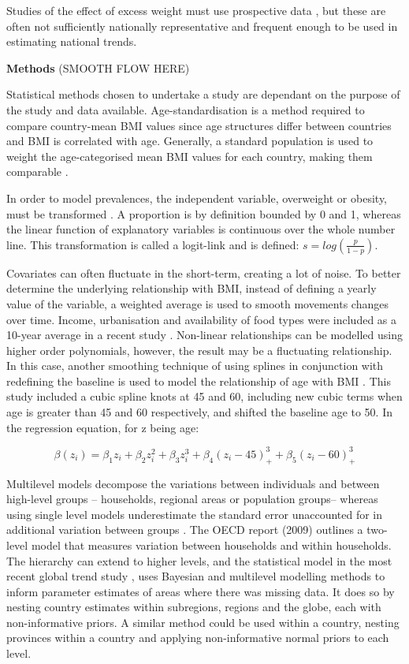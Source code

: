 \documentclass[12pt,a4paper]{article}
\begin{document}
Studies of the effect of excess weight must use prospective data \citep{guh09}, but these are often not sufficiently nationally representative and frequent enough to be used in estimating national trends.





	
\textbf{Methods} (SMOOTH FLOW HERE)

Statistical methods chosen to undertake a study are dependant on the purpose of the study and data available.  Age-standardisation is a method required to compare country-mean BMI values since age structures differ between countries and BMI is correlated with age. Generally, a standard population is used to weight the age-categorised mean BMI values for each country, making them comparable   \citep{ezzati05}.

In order to model prevalences, the independent variable, overweight or obesity, must be transformed \citep{stevens12}. A proportion is by definition bounded by 0 and 1, whereas the linear function of explanatory variables is continuous over the whole number line. This transformation is called a logit-link and is defined: $s=log(\frac{p}{1-p})$. 

Covariates can often fluctuate in the short-term, creating a lot of noise. To better determine the underlying relationship with BMI, instead of defining a yearly value of the variable, a weighted average is used to smooth movements changes over time. Income, urbanisation and availability of food types were included as a 10-year average in a recent study \cite{stevens11}. Non-linear relationships can be modelled using higher order polynomials, however, the result may be a fluctuating relationship. In this case, another smoothing technique of using splines in conjunction with redefining the baseline is used to model the relationship of age with BMI \citep{stevens11}. This study included a cubic spline knots at 45 and 60, including new cubic terms when age is greater than 45 and 60 respectively, and shifted the baseline age to 50. In the regression equation, for z being age:

\[\beta(z_i) = \beta_{1}z_i + \beta_{2}z_i^2 + \beta_{3}z_i^3 + \beta_{4}(z_i-45)^3_+ + \beta_{5}(z_i-60)^3_+\]

Multilevel models decompose the variations between individuals and between high-level groups -- households, regional areas or population groups-- whereas using single level models underestimate the standard error unaccounted for in additional variation between groups \citep{multilevel}. The OECD report (2009) outlines a two-level model that measures variation between households and within households. The hierarchy can extend to higher levels, and the statistical model in the most recent global trend study \citep{stevens11}, uses Bayesian and multilevel modelling methods to inform parameter estimates of areas where there was missing data. It does so by nesting country estimates within subregions, regions and the globe, each with non-informative priors. A similar method could be used within a country, nesting provinces within a country and applying non-informative normal priors to each level. 
\end{document}
